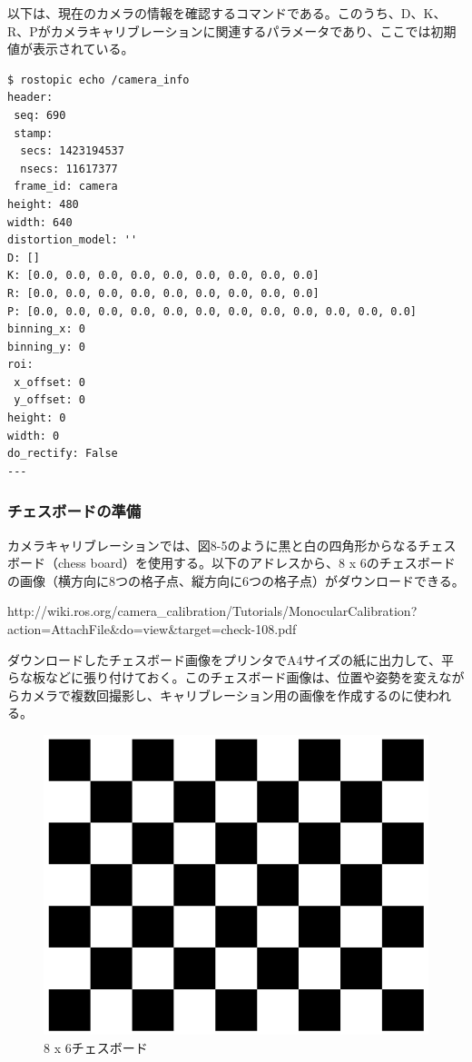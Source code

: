 以下は、現在のカメラの情報を確認するコマンドである。このうち、D、K、R、Pがカメラキャリブレーションに関連するパラメータであり、ここでは初期値が表示されている。

\begin{lstlisting}[language=ROS]
$ rostopic echo /camera_info
header:
 seq: 690
 stamp:
  secs: 1423194537
  nsecs: 11617377
 frame_id: camera
height: 480
width: 640
distortion_model: ''
D: []
K: [0.0, 0.0, 0.0, 0.0, 0.0, 0.0, 0.0, 0.0, 0.0]
R: [0.0, 0.0, 0.0, 0.0, 0.0, 0.0, 0.0, 0.0, 0.0]
P: [0.0, 0.0, 0.0, 0.0, 0.0, 0.0, 0.0, 0.0, 0.0, 0.0, 0.0, 0.0]
binning_x: 0
binning_y: 0
roi:
 x_offset: 0
 y_offset: 0
height: 0
width: 0
do_rectify: False
---
\end{lstlisting}

\subsubsection{チェスボードの準備}

カメラキャリブレーションでは、図8-5のように黒と白の四角形からなるチェスボード（chess board）を使用する。以下のアドレスから、8 x 6のチェスボードの画像（横方向に8つの格子点、縦方向に6つの格子点）がダウンロードできる。

http://wiki.ros.org/camera\_calibration/Tutorials/MonocularCalibration?action=AttachFile&do=view&target=check-108.pdf

ダウンロードしたチェスボード画像をプリンタでA4サイズの紙に出力して、平らな板などに張り付けておく。このチェスボード画像は、位置や姿勢を変えながらカメラで複数回撮影し、キャリブレーション用の画像を作成するのに使われる。

\begin{figure}[ht]
  \centering
  \includegraphics[width=\columnwidth]{pictures/chapter8/pic_08_05.png}
  \caption{8 x 6チェスボード}
\end{figure}


